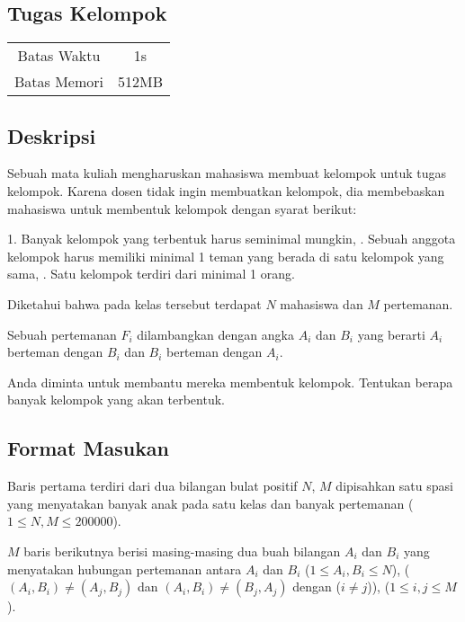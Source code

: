 \documentclass{article}
\begin{document}
\begin{center}
    \section*{Tugas Kelompok} %

    \begin{tabular}{ | c c | }
        \hline
        Batas Waktu  & 1s \\    %
        Batas Memori & 512MB \\  %
        \hline
    \end{tabular}
\end{center}

\subsection*{Deskripsi}
Sebuah mata kuliah mengharuskan mahasiswa membuat kelompok untuk tugas kelompok. Karena dosen tidak ingin membuatkan kelompok, dia membebaskan mahasiswa untuk membentuk kelompok dengan syarat berikut:

1. Banyak kelompok yang terbentuk harus seminimal mungkin,
. Sebuah anggota kelompok harus memiliki minimal 1 teman yang berada di satu kelompok yang sama,
. Satu kelompok terdiri dari minimal 1 orang.

Diketahui bahwa pada kelas tersebut terdapat $N$ mahasiswa dan $M$ pertemanan.

Sebuah pertemanan $F_i$ dilambangkan dengan angka $A_i$ dan $B_i$ yang berarti $A_i$ berteman dengan $B_i$ dan $B_i$ berteman dengan $A_i$.

Anda diminta untuk membantu mereka membentuk kelompok. Tentukan berapa banyak kelompok yang akan terbentuk.

\subsection*{Format Masukan}

Baris pertama terdiri dari dua bilangan bulat positif $N$, $M$ dipisahkan satu spasi yang menyatakan banyak anak pada satu kelas dan banyak pertemanan ($1 \leq N, M \leq 200000$).

$M$ baris berikutnya berisi masing-masing dua buah bilangan $A_i$ dan $B_i$ yang menyatakan hubungan pertemanan antara $A_i$ dan $B_i$ ($1 \leq A_i, B_i \leq N$), ($(A_i, B_i) \neq (A_j, B_j)$ dan $(A_i, B_i) \neq (B_j, A_j)$ dengan ($i \neq j$)), ($1 \leq i, j \leq M$).
\end{document}
